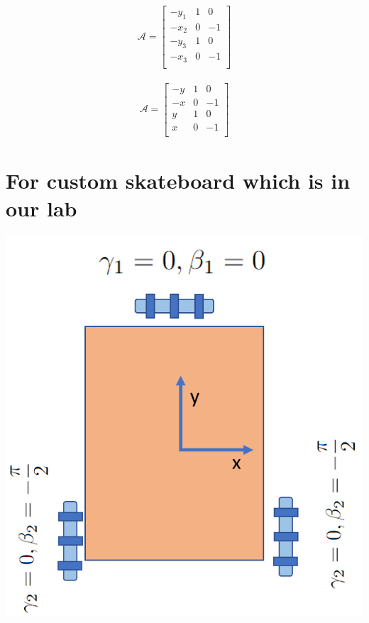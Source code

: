 \documentclass{article}
\begin{document}
\begin{align}
    \mathcal{A} =
    \begin{bmatrix}
        -y_1 & 1 & 0  \\
        -x_2 & 0 & -1 \\
        -y_3 & 1 & 0  \\
        -x_3 & 0 & -1 \\
    \end{bmatrix}
\end{align}

\begin{align}
    \mathcal{A} =
    \begin{bmatrix}
        -y & 1 & 0  \\
        -x & 0 & -1 \\
        y & 1 & 0  \\
        x & 0 & -1 \\
    \end{bmatrix}
\end{align}

\section{For custom skateboard which is in our lab}

\includegraphics{custom_skateboard.png}
\end{document}
